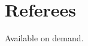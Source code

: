 \documentclass[10pt,a4paper]{moderncv} %
\begin{document}




\section{Referees}

Available on demand.

\end{document}
